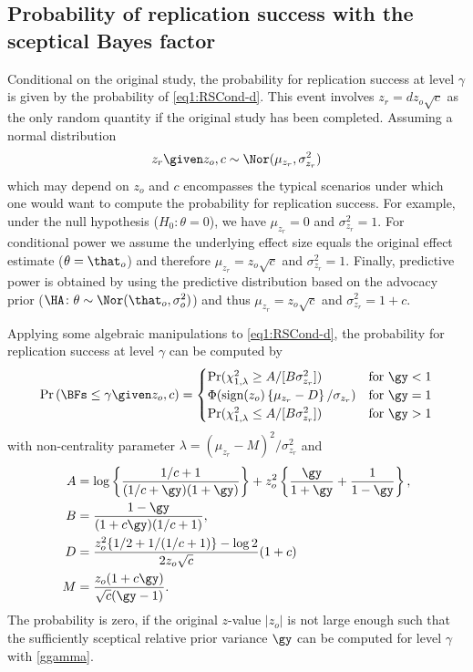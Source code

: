 \begin{subappendices}
\section{Probability of replication success with the sceptical Bayes factor}
\label{app:powerBFs}
Conditional on the original study, the probability for replication success at
level $\gamma$ is given by the probability of \eqref{eq1:RSCond-d}. This event
involves $z_r = dz_o \sqrt{c}$ as the only random quantity if the original study
has been completed. Assuming a normal distribution
\begin{align*}
  z_r \given z_o, c \sim \Nor(\mu_{z_r}, \sigma^2_{z_r})
\end{align*}
which may depend on $z_o$ and $c$ encompasses the typical scenarios under which
one would want to compute the probability for replication success. For example,
under the null hypothesis ($H_{0} \colon \theta = 0$), we have $\mu_{z_r} = 0$
and $\sigma^2_{z_r} = 1$. For conditional power we assume the underlying effect
size equals the original effect estimate ($\theta = \that_o$) and therefore
$\mu_{z_r} = z_o \sqrt{c}$ and $\sigma^2_{z_r} = 1$. Finally, predictive power
is obtained by using the predictive distribution based on the advocacy prior
($\HA \colon \theta \sim \Nor(\that_o, \sigma^2_o)$) and thus
$\mu_{z_r} = z_o \sqrt{c}$ and $\sigma^2_{z_r} = 1 + c$.

Applying some algebraic manipulations to \eqref{eq1:RSCond-d}, the
probability for replication success at level $\gamma$ can be computed by
\begin{align}
  \label{eq1:powerBFs}
  \Pr\left(\BFs \leq \gamma \given z_o, c\right) =
  \begin{cases}
    \Pr(\chi^2_{1,\lambda} \geq  A/[B \sigma^2_{z_r}])
    & \text{for} ~ \gy < 1 \\
    \Phi(\text{sign}(z_o) \left\{\mu_{z_r} - D\right\}/\sigma_{z_r})
    & \text{for} ~ \gy = 1 \\
    \Pr(\chi^2_{1,\lambda} \leq A/[B \sigma^2_{z_r}])
    & \text{for} ~ \gy > 1
  \end{cases}
\end{align}
with non-centrality parameter $\lambda = (\mu_{z_r} - M)^2/\sigma^2_{z_r}$
and
\begin{align*}
  A &= \log \left\{ \frac{1/c + 1}{(1/c + \gy)(1 + \gy)}\right\} +
  z_o^2 \left\{\frac{\gy}{1 + \gy} + \frac{1}{1 - \gy} \right\}, \\
  B &= \frac{1 - \gy}{(1 + c\gy)(1/c + 1)}, \\
  D &= \frac{z_o^2 \{1/2 + 1/(1/c + 1)\} - \log 2}{2 z_o \sqrt{c}} (1 + c) \\
  M &= \frac{z_o(1 + c\gy)}{\sqrt{c}(\gy - 1)}.
\end{align*}
The probability is zero, if the original $z$-value $|z_o|$ is not large enough
such that the sufficiently sceptical relative prior variance $\gy$ can be
computed for level $\gamma$ with \eqref{ggamma}.


\end{subappendices}
